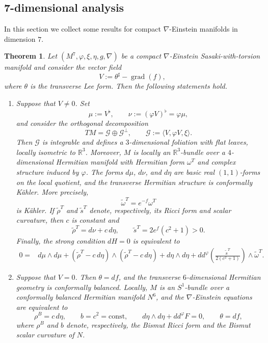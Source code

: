 \documentclass{article}
\newtheorem{thm}{Theorem}[section]
\theoremstyle{definition}
\renewcommand{\phi}{\varphi}
\numberwithin{equation}{section}
\begin{document}
\subsection{7-dimensional analysis}
In this section we collect some results for compact $\nabla$-Einstein manifolds in dimension $7$. 
\begin{thm}
\label{thm:7dimensional-structure}
Let $(M^7,\phi,\xi,\eta,g,\nabla)$ be a compact $\nabla$-Einstein
Sasaki-with-torsion manifold and consider the vector field
\[
V:=\theta^\sharp-\operatorname{grad}(f),
\]
where $\theta$ is the transverse Lee form. 
Then the following statements hold.

\begin{enumerate}
\item Suppose that $V\neq0$. Set
\[
\mu:=V^\flat,
\qquad
\nu:=(\phi V)^\flat=\phi\mu,
\]
and consider the orthogonal decomposition
\[
TM=\mathcal G\oplus\mathcal G^\perp,
\qquad
\mathcal G:=\langle V,\phi V,\xi\rangle.
\]
Then $\mathcal G$ is integrable and defines a $3$-dimensional foliation
with flat leaves, locally isometric to $\mathbb R^3$. Moreover, $M$ is
locally an $\mathbb R^3$-bundle over a $4$-dimensional Hermitian
manifold with Hermitian form $\omega^T$ and complex structure induced
by $\phi$. The forms $d\mu$, $d\nu$, and $d\eta$ are basic real $(1,1)$-forms on
the local quotient, and the transverse Hermitian structure is conformally K\"ahler. More
precisely,
\[
\widetilde\omega^T=e^{-f}\omega^T
\]
is K\"ahler. If $\widetilde\rho^T$ and $\widetilde s^T$ denote,
respectively, its Ricci form and scalar curvature, then $c$ is constant
and
\begin{equation}
\label{eqn:rho2}
\widetilde\rho^T=d\nu+c\,d\eta,
\qquad
\widetilde s^T=2e^f(c^2+1)>0.
\end{equation}
Finally, the strong condition $dH=0$ is equivalent to
\begin{equation}
\label{eqn:dim7}
\begin{split}
0={}&
d\mu\wedge d\mu
+
(\widetilde\rho^T-c\,d\eta)
 \wedge
(\widetilde\rho^T-c\,d\eta)
+
d\eta\wedge d\eta
+
dd^\phi\left(
\frac{\widetilde s^T}{2(c^2+1)}
\right)
\wedge\widetilde\omega^T.
\end{split}
\end{equation}

\item Suppose that $V=0$. Then $\theta=df$, and the transverse
$6$-dimensional Hermitian geometry is conformally balanced. Locally,
$M$ is an $S^1$-bundle over a conformally balanced Hermitian manifold
$N^6$, and the $\nabla$-Einstein equations are equivalent to
\begin{equation}
\label{eqn:7dim}
\rho^B=c\,d\eta,
\qquad
b=c^2=\mathrm{const},
\qquad
d\eta\wedge d\eta+dd^\phi F=0,
\qquad
\theta=df,
\end{equation}
where $\rho^B$ and $b$ denote, respectively, the Bismut Ricci form and
the Bismut scalar curvature of $N$.


\end{enumerate}
\end{thm}
\end{document}

